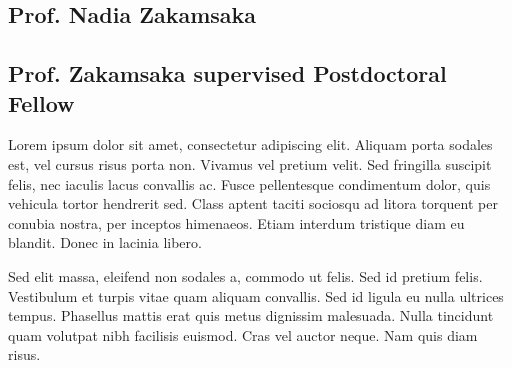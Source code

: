 \subsection*{Prof. Nadia Zakamsaka} 


\subsection*{Prof. Zakamsaka supervised Postdoctoral Fellow}
Lorem ipsum dolor sit amet, consectetur adipiscing elit. Aliquam porta
sodales est, vel cursus risus porta non. Vivamus vel pretium
velit. Sed fringilla suscipit felis, nec iaculis lacus convallis
ac. Fusce pellentesque condimentum dolor, quis vehicula tortor
hendrerit sed. Class aptent taciti sociosqu ad litora torquent per
conubia nostra, per inceptos himenaeos. Etiam interdum tristique diam
eu blandit. Donec in lacinia libero.

\smallskip \smallskip \noindent
Sed elit massa, eleifend non sodales a, commodo ut felis. Sed id
pretium felis. Vestibulum et turpis vitae quam aliquam convallis. Sed
id ligula eu nulla ultrices tempus. Phasellus mattis erat quis metus
dignissim malesuada. Nulla tincidunt quam volutpat nibh facilisis
euismod. Cras vel auctor neque. Nam quis diam risus.
